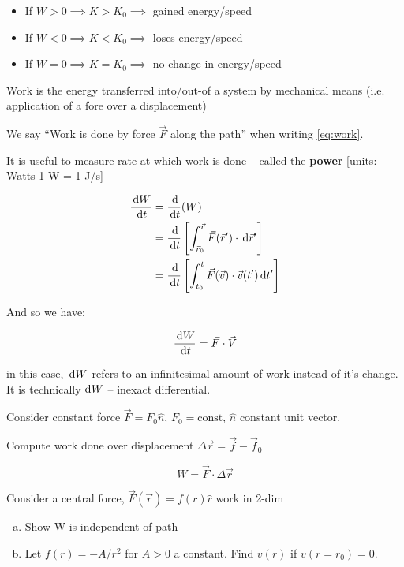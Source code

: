 \begin{itemize}
	\item If $W > 0 \implies K > K_0 \implies$ gained energy/speed
	\item If $W < 0 \implies K < K_0 \implies$ loses energy/speed
	\item If $W = 0 \implies K = K_0 \implies$ no change in energy/speed
\end{itemize}

Work is the energy transferred into/out-of a system by mechanical means (i.e. application of a fore over a displacement)

We say ``Work is done by force $\vec F$ along the path'' when writing \cref*{eq:work}.

It is useful to measure rate at which work is done -- called the \textbf{power} [units: Watts 1 W = 1 J/s]

\begin{align} 
	\frac{\D W}{\D t} &= \frac{\D}{\D t}(W)\\
	&= \frac{\D}{\D t} \left[\int_{\vec r_0}^{\vec r} \vec F(\vec r') \cdot \D \vec r'\right]\\
	&= \frac{\D}{\D t} \left[\int_{t_0}^t \vec F(\vec v) \cdot \vec v(t') \D t'\right]
\end{align}

And so we have:

\begin{equation} \label{eq:power}
	\frac{\D W}{\D t} = \vec F \cdot \vec V
\end{equation}

in this case, $\D W$ refers to an infinitesimal amount of work instead of it's change. It is technically $\mathrm{d}\hspace*{-0.08em}\bar{}\hspace*{0.1em} W$ -- inexact differential.

\begin{example}
	Consider constant force $\vec F = F_0 \hat n$, $F_0 = \mathrm{const}$, $\hat n$ constant unit vector.

	Compute work done over displacement $\Delta \vec r = \vec f - \vec f_0$
\end{example}

\begin{sol}
	\begin{equation}
		W = \vec F \cdot \Delta \vec r
	\end{equation}
\end{sol}

\begin{example}
	Consider a central force, $\vec F(\vec r) = f(r) \hat r$ work in 2-dim

	\begin{enumerate}[(a)]
		\item Show W is independent of path
		\item Let $f(r) = - A/r^2$ for $A > 0$ a constant. Find $v(r)$ if $v(r = r_0) = 0$.
	\end{enumerate}
\end{example}

